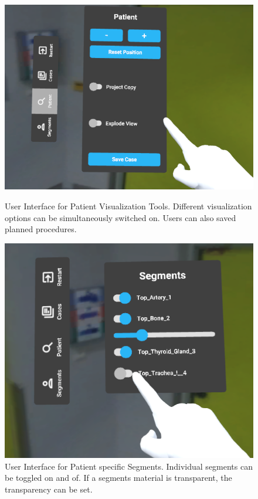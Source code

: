 \begin{figure}[ht]
    \centering
    \begin{minipage}{.5\textwidth}
      \centering
      \includegraphics[width=0.99\linewidth]{images/implementation/user_interface/patient.png}
      \caption{\label{fig::UIPatient}User Interface for Patient Visualization Tools. Different visualization options can be simultaneously switched on.
      Users can also saved planned procedures.}
    \end{minipage}%
    \begin{minipage}{.5\textwidth}
      \centering
      \includegraphics[width=0.99\linewidth]{images/implementation/user_interface/segments.png}
      \caption{\label{fig::UIPatientSegments}User Interface for Patient specific Segments. Individual segments can be toggled on and of. If a segments material is transparent, 
      the transparency can be set.}
    \end{minipage}
  \end{figure}